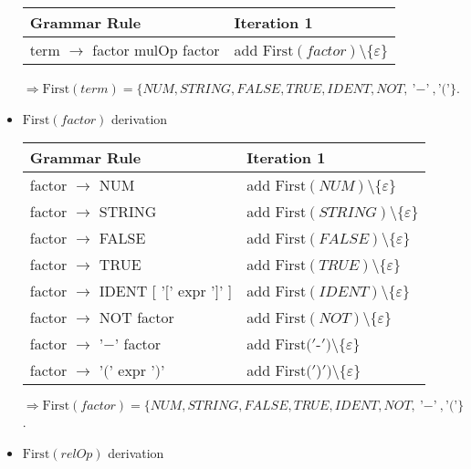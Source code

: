 \documentclass[8pt]{scrartcl}
\newcommand{\First}[1]{\mathrm{First}(#1)}
\newcommand{\epsset}{\{\varepsilon\}}
\begin{document}
\begin{itemize}
                \begin{tabular}{|l |l |}
                    \hline
                    \textbf{Grammar Rule} & \textbf{Iteration 1}\\
                    \hline
                    term $\rightarrow$ factor { mulOp factor } & add $\First{factor} \setminus \epsset$\\
                    \hline
                \end{tabular}\newline
                $\Rightarrow \First{term} = \{NUM, STRING, FALSE, TRUE, IDENT, NOT, \text{'$-$'}, \text{'$($'}\}$.
            \item $\First{factor}$ derivation\newline
                \begin{tabular}{|l |l |}
                    \hline
                    \textbf{Grammar Rule} & \textbf{Iteration 1}\\
                    \hline
                    factor $\rightarrow$ NUM & add $\First{NUM} \setminus \epsset$\\
                    \hline
                    factor $\rightarrow$ STRING & add $\First{STRING} \setminus \epsset$\\
                    \hline
                    factor $\rightarrow$ FALSE & add $\First{FALSE} \setminus \epsset$\\
                    \hline
                    factor $\rightarrow$ TRUE & add $\First{TRUE} \setminus \epsset$\\
                    \hline
                    factor $\rightarrow$ IDENT [ '$[$' expr '$]$' ] & add $\First{IDENT} \setminus \epsset$\\
                    \hline
                    factor $\rightarrow$ NOT factor & add $\First{NOT} \setminus \epsset$\\
                    \hline
                    factor $\rightarrow$ '$-$' factor & add $\First{'$-$'} \setminus \epsset$\\
                    \hline
                    factor $\rightarrow$ '$($' expr '$)$' & add $\First{'$)$'} \setminus \epsset$\\
                    \hline
                \end{tabular}\newline
                $\Rightarrow \First{factor} = \{NUM, STRING, FALSE, TRUE, IDENT, NOT, \text{'$-$'}, \text{'$($'}\}$.
            \item $\First{relOp}$ derivation\newline

\end{itemize}
\end{document}
